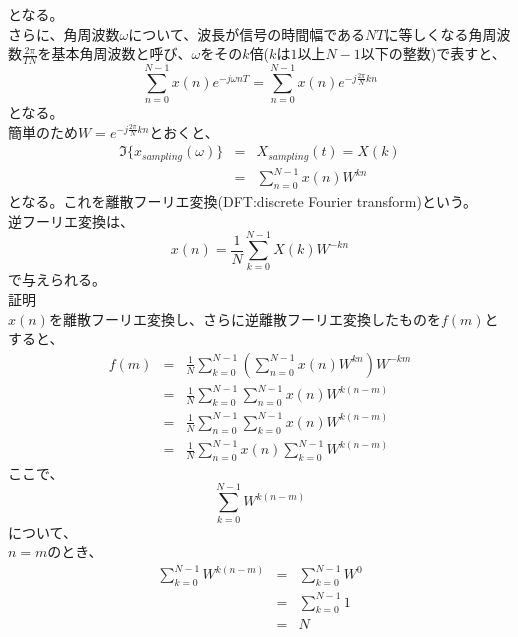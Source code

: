 \documentclass[a4paper]{jsarticle}
\begin{document}
となる。\\
さらに、角周波数$\omega$について、波長が信号の時間幅である$NT$に等しくなる角周波数$\frac { 2 \pi } { TN }$を基本角周波数と呼び、$\omega$をその$k$倍($k$は$1$以上$N-1$以下の整数)で表すと、
\begin{equation}
\sum _{ n = 0 } ^{ N - 1 } x \left( n \right) e ^ { -j \omega nT } = \sum _{ n = 0 } ^{ N - 1 } x \left( n \right) e ^ { -j \frac { 2 \pi } { N } kn }
\end{equation}
となる。\\
簡単のため$W = e ^{ -j \frac { 2 \pi } { N } kn}$とおくと、
\begin{eqnarray}
	\mathfrak{I} \bigl\{ x_{sampling} \left( \omega \right) \bigr\} &=& X_{sampling} \left( t \right) \nonumber = X \left( k \right) \\
	&=& \sum _{ n = 0 } ^{ N - 1 } x \left( n \right) W ^{ kn }
\end{eqnarray}
となる。これを離散フーリエ変換(DFT:discrete Fourier transform)という。\\
逆フーリエ変換は、
\begin{equation}
	x \left( n \right) = \frac { 1 } { N } \sum _{ k = 0 } ^{ N - 1 } X \left( k \right) W ^ { -kn }
\end{equation}
で与えられる。\\
証明\\
$x \left( n \right)$を離散フーリエ変換し、さらに逆離散フーリエ変換したものを$f \left( m \right)$とすると、
\begin{eqnarray}
	f \left( m \right) &=& \frac{1}{N} \sum _{k = 0} ^{N - 1} \left( \sum _{n = 0} ^{N - 1} x \left( n \right) W ^{kn} \right) W ^{-km} \nonumber \\
	&=& \frac{1}{N} \sum _{k = 0} ^{N - 1} \sum _{n = 0} ^{N - 1} x \left( n \right) W ^{k \left( n - m \right) } \nonumber \\
	&=& \frac{1}{N} \sum _{n = 0} ^{N - 1} \sum _{k = 0} ^{N - 1} x \left( n \right) W ^{k \left( n - m \right) } \nonumber \\
	&=& \frac{1}{N} \sum _{n = 0} ^{N - 1} x \left( n \right) \sum _{k = 0} ^{N - 1} W ^{k \left( n - m \right) }
\end{eqnarray}
ここで、
\begin{equation}
\sum _{k = 0} ^{N - 1} W ^{k \left( n - m \right) } \nonumber
\end{equation}
について、\\
$n = m$のとき、
\begin{eqnarray}
	\sum _{k = 0} ^{N - 1} W ^{k \left( n - m \right) } &=& \sum _{k = 0} ^{N - 1} W ^0 \nonumber \\
	&=& \sum _{k = 0} ^{N - 1} 1 \nonumber \\
	&=& N \nonumber \\
\end{eqnarray}
\end{document}
